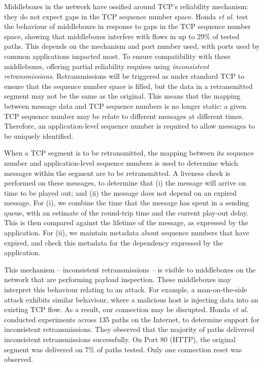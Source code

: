\documentclass{sig-alternate-05-2015}
\begin{document}
Middleboxes in the network have ossified around TCP's reliability
mechanism: they do not expect gaps in the TCP sequence number space.
Honda \emph{et al.} \cite{honda:2011:extend-tcp} test the behaviour of
middleboxes in response to gaps in the TCP sequence number space, showing
that middleboxes interfere with flows in up to 29\% of tested paths. This
depends on the mechanism and port number used, with ports used by common
applications impacted most. To ensure compatibility with these middleboxes,
offering partial reliability requires using \emph{inconsistent
retransmissions}. Retransmissions will be triggered as under standard TCP
to ensure that the sequence number space is filled, but the data in a
retransmitted segment may not be the same as the original. This means that
the mapping between message data and TCP sequence numbers is no longer
static: a given TCP sequence number may be relate to different messages at
different times. Therefore, an application-level sequence number is
required to allow messages to be uniquely identified.

When a TCP segment is to be retransmitted, the mapping between its
sequence number and application-level sequence numbers is used to determine
which messages within the segment are to be retransmitted. A liveness check
is performed on these messages, to determine that (i) the message will
arrive on time to be played out; and (ii) the message does not depend on an
expired message. For (i), we combine the time that the message has spent in
a sending queue, with an estimate of the round-trip time and the current
play-out delay. This is then compared against the lifetime of the message,
as expressed by the application. For (ii), we maintain metadata about
sequence numbers that have expired, and check this metadata for the
dependency expressed by the application.

This mechanism -- inconsistent retransmissions -- is visible to middleboxes
on the network that are performing payload inspection. These middleboxes
may interpret this behaviour relating to an attack. For example, a
man-on-the-side attack exhibits similar behaviour, where a malicious host
is injecting data into an existing TCP flow. As a result, our connection
may be disrupted. Honda \emph{et al}.\ \cite{honda:2011:extend-tcp} conducted
experiments across 135 paths on the Internet, to determine support for
inconsistent retransmissions. They observed that the majority of paths
delivered inconsistent retransmissions successfully. On Port 80 (HTTP), the
original segment was delivered on 7\% of paths tested. Only one connection
reset was observed.
\end{document}
